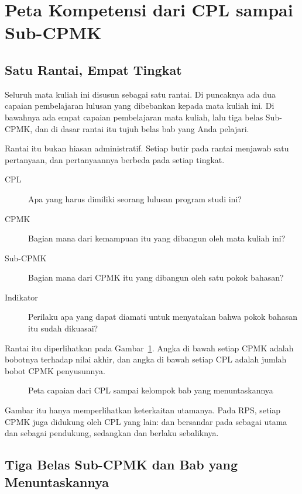 \section{Peta Kompetensi dari CPL sampai Sub-CPMK}
\label{sec:peta-kompetensi}

\subsection{Satu Rantai, Empat Tingkat}

Seluruh mata kuliah ini disusun sebagai satu rantai. Di puncaknya ada dua
capaian pembelajaran lulusan yang dibebankan kepada mata kuliah ini. Di
bawahnya ada empat capaian pembelajaran mata kuliah, lalu tiga belas
Sub-CPMK, dan di dasar rantai itu tujuh belas bab yang Anda pelajari.

Rantai itu bukan hiasan administratif. Setiap butir pada rantai menjawab satu
pertanyaan, dan pertanyaannya berbeda pada setiap tingkat.

\begin{description}
  \item[CPL] Apa yang harus dimiliki seorang lulusan program studi ini?
  \item[CPMK] Bagian mana dari kemampuan itu yang dibangun oleh mata kuliah
        ini?
  \item[Sub-CPMK] Bagian mana dari CPMK itu yang dibangun oleh satu pokok
        bahasan?
  \item[Indikator] Perilaku apa yang dapat diamati untuk menyatakan bahwa
        pokok bahasan itu sudah dikuasai?
\end{description}

Rantai itu diperlihatkan pada Gambar~\ref{fig:peta-kompetensi}. Angka di
bawah setiap CPMK adalah bobotnya terhadap nilai akhir, dan angka di bawah
setiap CPL adalah jumlah bobot CPMK penyusunnya.

\begin{figure}[htbp]
\centering

\caption{Peta capaian dari CPL sampai kelompok bab yang menuntaskannya}
\label{fig:peta-kompetensi}
\end{figure}

Gambar itu hanya memperlihatkan keterkaitan utamanya. Pada RPS, setiap CPMK
juga didukung oleh CPL yang lain:  dan  bersandar pada
 sebagai utama dan  sebagai pendukung, sedangkan  dan
 berlaku sebaliknya.

\subsection{Tiga Belas Sub-CPMK dan Bab yang Menuntaskannya}

